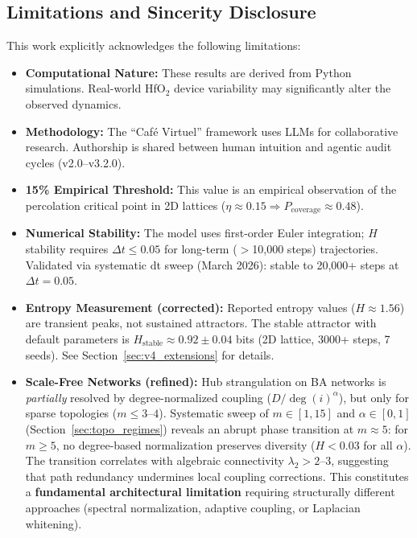 \documentclass[11pt]{article}
\begin{document}
\subsection{Limitations and Sincerity Disclosure}
This work explicitly acknowledges the following limitations:
\begin{itemize}
    \item \textbf{Computational Nature:} These results are derived from Python simulations. Real-world HfO$_2$ device variability may significantly alter the observed dynamics.
    \item \textbf{Methodology:} The ``Caf\'e Virtuel'' framework uses LLMs for collaborative research. Authorship is shared between human intuition and agentic audit cycles (v2.0--v3.2.0).
    \item \textbf{15\% Empirical Threshold:} This value is an empirical observation of the percolation critical point in 2D lattices ($\eta \approx 0.15 \Rightarrow P_{\text{coverage}} \approx 0.48$).
    \item \textbf{Numerical Stability:} The model uses first-order Euler integration; $H$ stability requires $\Delta t \le 0.05$ for long-term ($>$10{,}000 steps) trajectories. Validated via systematic dt sweep (March 2026): stable to 20{,}000+ steps at $\Delta t = 0.05$.
    \item \textbf{Entropy Measurement (corrected):} Reported entropy values ($H \approx 1.56$) are transient peaks, not sustained attractors. The stable attractor with default parameters is $H_{\text{stable}} \approx 0.92 \pm 0.04$ bits (2D lattice, 3000+ steps, 7 seeds). See Section~\ref{sec:v4_extensions} for details.
    \item \textbf{Scale-Free Networks (refined):} Hub strangulation on BA networks is \emph{partially} resolved by degree-normalized coupling ($D/\deg(i)^\alpha$), but only for sparse topologies ($m \leq 3$--$4$). Systematic sweep of $m \in [1, 15]$ and $\alpha \in [0, 1]$ (Section~\ref{sec:topo_regimes}) reveals an abrupt phase transition at $m \approx 5$: for $m \geq 5$, no degree-based normalization preserves diversity ($H < 0.03$ for all $\alpha$). The transition correlates with algebraic connectivity $\lambda_2 > 2$--$3$, suggesting that path redundancy undermines local coupling corrections. This constitutes a \textbf{fundamental architectural limitation} requiring structurally different approaches (spectral normalization, adaptive coupling, or Laplacian whitening).\end{itemize}
\end{document}
